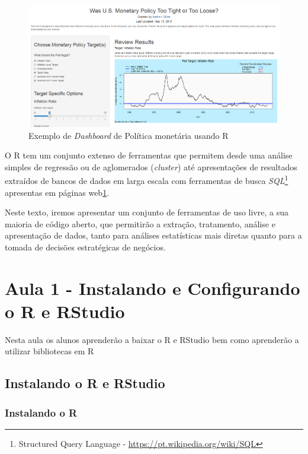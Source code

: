 \documentclass[12pt,a4paper,oneside]{erdc}
\begin{document}
\begin{figure}
	\centering
	\includegraphics[width=\linewidth]{../figs/f-Intro-01-Monetary-Policy}
	\caption{Exemplo de \textit{Dashboard} de Política monetária usando R \cite{Showmeshiny2019}}
	\label{fig:f-intro-01}
\end{figure}

O R tem um conjunto extenso de ferramentas que permitem desde uma análise simples de regressão ou de aglomerados (\textit{cluster}) até apresentações de resultados extraídos de bancos de dados em larga escala com ferramentas de busca \textit{SQL}\footnote{Structured Query Language - \url{https://pt.wikipedia.org/wiki/SQL}} apresentas em páginas web\ref{fig:f-intro-01}.

Neste texto, iremos apresentar um conjunto de ferramentas de uso livre, a sua maioria de código aberto, que permitirão a extração, tratamento, análise e apresentação de dados, tanto para análises estatísticas mais diretas quanto para a tomada de decisões estratégicas de negócios.

%
%

\chapter{Aula 1 - Instalando e Configurando o R e RStudio}

Nesta aula os alunos aprenderão a baixar o R e RStudio bem como aprenderão a utilizar bibliotecas em R


\section{Instalando o R e RStudio}

\subsection{Instalando o R}
\end{document}
